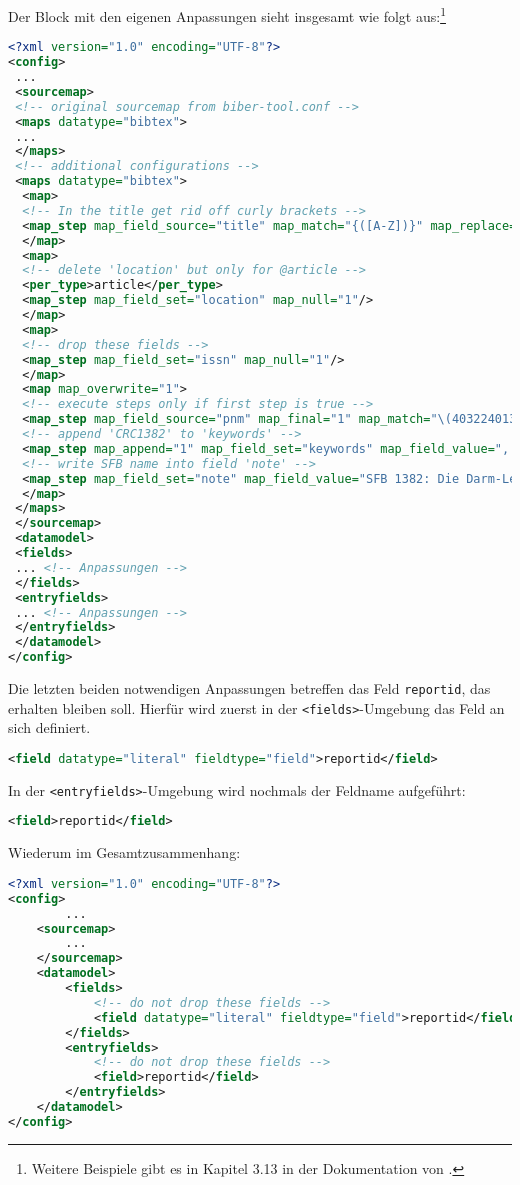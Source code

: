 \documentclass[ngerman]{dtk}
\begin{document}
Der Block mit den eigenen Anpassungen sieht insgesamt wie folgt aus:\footnote{Weitere Beispiele gibt es in Kapitel 3.13 in der Dokumentation von \cite{biber}.}
\begin{lstlisting}[style=number,language=xml]
<?xml version="1.0" encoding="UTF-8"?>
<config>
 ...
 <sourcemap>
 <!-- original sourcemap from biber-tool.conf -->
 <maps datatype="bibtex">
 ... 
 </maps>
 <!-- additional configurations -->
 <maps datatype="bibtex">
  <map>
  <!-- In the title get rid off curly brackets -->
  <map_step map_field_source="title" map_match="{([A-Z])}" map_replace="$1"/>
  </map>
  <map>
  <!-- delete 'location' but only for @article -->
  <per_type>article</per_type>
  <map_step map_field_set="location" map_null="1"/>
  </map>
  <map>
  <!-- drop these fields -->
  <map_step map_field_set="issn" map_null="1"/>
  </map>
  <map map_overwrite="1">
  <!-- execute steps only if first step is true -->
  <map_step map_field_source="pnm" map_final="1" map_match="\(403224013\)"/>
  <!-- append 'CRC1382' to 'keywords' -->
  <map_step map_append="1" map_field_set="keywords" map_field_value=", CRC1382"/>
  <!-- write SFB name into field 'note' -->
  <map_step map_field_set="note" map_field_value="SFB 1382: Die Darm-Leber-Achse -- Funktionelle Zusammenhänge und therapeutische Strategien (403224013)"/>
  </map>
 </maps>
 </sourcemap>
 <datamodel>
 <fields>
 ... <!-- Anpassungen -->
 </fields>
 <entryfields>
 ... <!-- Anpassungen -->
 </entryfields>
 </datamodel>
</config>
\end{lstlisting}
Die letzten beiden notwendigen Anpassungen betreffen das Feld \texttt{reportid}, das erhalten bleiben soll.
Hierfür wird zuerst in der \texttt{<fields>}-Umgebung das Feld an sich definiert.
\begin{lstlisting}[style=nonumber,language=xml]
<field datatype="literal" fieldtype="field">reportid</field>
\end{lstlisting}
In der \texttt{<entryfields>}-Umgebung wird nochmals der Feldname aufgeführt:
\begin{lstlisting}[style=nonumber,language=xml]
<field>reportid</field>
\end{lstlisting}
Wiederum im Gesamtzusammenhang:
\begin{lstlisting}[style=number,language=xml]
<?xml version="1.0" encoding="UTF-8"?>
<config>
        ...
    <sourcemap>
        ...
    </sourcemap>
    <datamodel>
        <fields>
            <!-- do not drop these fields -->
            <field datatype="literal" fieldtype="field">reportid</field>
        </fields>
        <entryfields>
            <!-- do not drop these fields -->
            <field>reportid</field>
        </entryfields>
    </datamodel>
</config>
\end{lstlisting}
\end{document}
